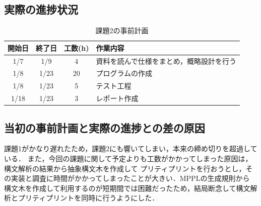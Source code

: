 \documentclass{jlreq}
\begin{document}
\subsection{実際の進捗状況}
\begin{table}[H]
  \centering
  \caption{課題2の事前計画}
  \begin{tabular}{cccp{7cm}}
    \hline
    開始日 & 終了日 & 工数(h) & 作業内容                                 \\ \hline
    1/7    & 1/9    & 4       & 資料を読んで仕様をまとめ，概略設計を行う \\
    1/8    & 1/23   & 20      & プログラムの作成                         \\
    1/8    & 1/23   & 5       & テスト工程                               \\
    1/18   & 1/23   & 3       & レポート作成                             \\
    \hline
  \end{tabular}
\end{table}

\subsection{当初の事前計画と実際の進捗との差の原因}
課題1がかなり遅れたため，課題2にも響いてしまい，本来の締め切りを超過している．
また，今回の課題に関して予定よりも工数がかかってしまった原因は，構文解析の結果から抽象構文木を作成して
プリティプリントを行おうとし，その実装と調査に時間がかかってしまったことが大きい．MPPLの生成規則から
構文木を作成して利用するのが短期間では困難だったため，結局断念して構文解析とプリティプリントを同時に行うようにした．
\end{document}
